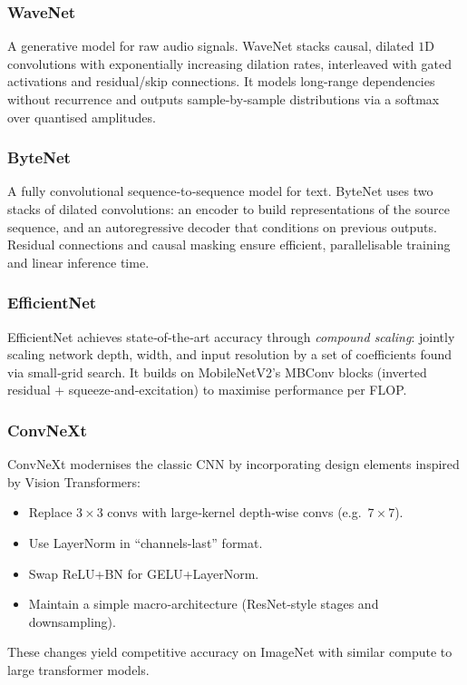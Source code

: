 \documentclass{article}
\begin{document}
\subsubsection{WaveNet}\label{wavenet}
A generative model for raw audio signals. WaveNet stacks causal, dilated $1$D convolutions with exponentially increasing dilation rates, interleaved with gated activations and residual/skip connections. It models long-range dependencies without recurrence and outputs sample‑by‑sample distributions via a softmax over quantised amplitudes.

\subsubsection{ByteNet}\label{bytenet}
A fully convolutional sequence‑to‑sequence model for text. ByteNet uses two stacks of dilated convolutions: an encoder to build representations of the source sequence, and an autoregressive decoder that conditions on previous outputs. Residual connections and causal masking ensure efficient, parallelisable training and linear inference time.

\subsubsection{EfficientNet}
EfficientNet achieves state‑of‑the‑art accuracy through \emph{compound scaling}: jointly scaling network depth, width, and input resolution by a set of coefficients found via small‑grid search. It builds on MobileNetV2’s MBConv blocks (inverted residual + squeeze‑and‑excitation) to maximise performance per FLOP.

\subsubsection{ConvNeXt}
ConvNeXt modernises the classic CNN by incorporating design elements inspired by Vision Transformers:  
\begin{itemize}
  \item Replace $3\times3$ convs with large‑kernel depth‑wise convs (e.g.\ $7\times7$).
  \item Use LayerNorm in “channels-last” format.
  \item Swap ReLU+BN for GELU+LayerNorm.
  \item Maintain a simple macro‑architecture (ResNet‑style stages and downsampling).
\end{itemize}
These changes yield competitive accuracy on ImageNet with similar compute to large transformer models.
\end{document}
